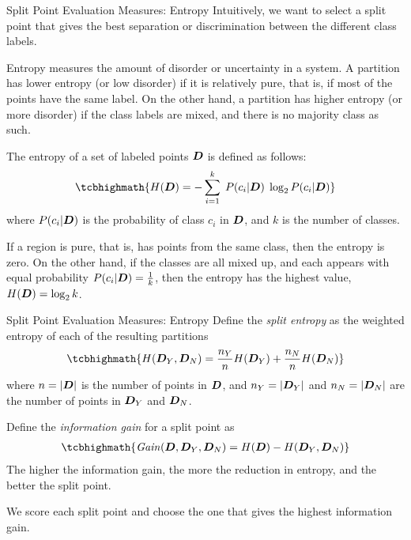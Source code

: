 \begin{frame}{Split Point Evaluation Measures: Entropy}
Intuitively, we want to
select a split point that gives the best separation or
discrimination between the different class labels.

\medskip
Entropy measures the amount of disorder or
uncertainty in a system.
A partition has lower entropy (or low
 disorder) if it is relatively pure, that is, if most of the points have the same label. On the other hand, a partition
has higher entropy (or more
disorder) if the class labels are mixed, and there is no majority class
as such.

\medskip
The entropy of a set of labeled points ${\boldsymbol D}$ is def\/{i}ned as
follows:
\begin{align*}
\tcbhighmath{
  H(\bD) = -\sum_{i=1}^k \;P(c_i|\bD) \;\log_2 P(c_i|\bD)
}
\end{align*}
where $P(c_i|{\boldsymbol D})$ is the probability of class $c_i$ in ${\boldsymbol D}$, and
$k$ is the number of classes. 

\medskip
If a region is pure, that is, has
points from the same class, then the entropy is zero. On the other
hand, if the classes are all mixed up, and each appears with equal
probability $P(c_i|{\boldsymbol D})=\tfrac{1}{k}$, then the entropy has the
highest value, $H({\boldsymbol D}) = \log_2 k$.
\end{frame}




\begin{frame}{Split Point Evaluation Measures: Entropy}
Def\/{i}ne the {\em split entropy} as the
weighted entropy of each of the resulting partitions
\begin{align*}
\tcbhighmath{
  H(\bD_Y,\bD_N) =
  \frac{n_Y}{n}H(\bD_Y)+\frac{n_N}{n}H(\bD_N)
}
\end{align*}
where $n = |{\boldsymbol D}|$ is the number of points in ${\boldsymbol D}$, and $n_Y = |{\boldsymbol D}_Y|$
and $n_N = |{\boldsymbol D}_N|$ are the number of points in ${\boldsymbol D}_Y$ and
${\boldsymbol D}_N$.

\medskip
Def\/{i}ne the {\em information gain}
for a split point as
\begin{align*}
\tcbhighmath{
  \mathit{Gain}(\bD,\bD_Y,\bD_N) = H(\bD) - H(\bD_Y,\bD_N)
}
\end{align*}
The higher the information gain, the more the reduction in
entropy, and the better the split point.  

\medskip
We score each split point
and choose the one that gives the highest information gain.
\end{frame}


